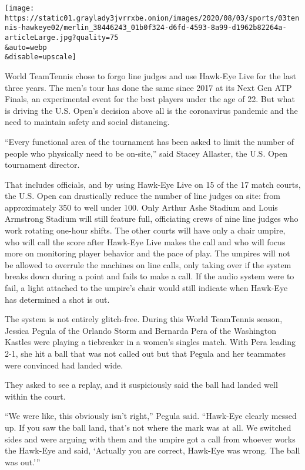 \texttt{[image: https://static01.graylady3jvrrxbe.onion/images/2020/08/03/sports/03tennis-hawkeye02/merlin\_38446243\_01b0f324-d6fd-4593-8a99-d1962b82264a-articleLarge.jpg?quality=75\\\&auto=webp\\\&disable=upscale]}

World TeamTennis chose to forgo line judges and use Hawk-Eye Live for
the last three years. The men's tour has done the same since 2017 at its
Next Gen ATP Finals, an experimental event for the best players under
the age of 22. But what is driving the U.S. Open's decision above all is
the coronavirus pandemic and the need to maintain safety and social
distancing.

``Every functional area of the tournament has been asked to limit the
number of people who physically need to be on-site,'' said Stacey
Allaster, the U.S. Open tournament director.

That includes officials, and by using Hawk-Eye Live on 15 of the 17
match courts, the U.S. Open can drastically reduce the number of line
judges on site: from approximately 350 to well under 100. Only Arthur
Ashe Stadium and Louis Armstrong Stadium will still feature full,
officiating crews of nine line judges who work rotating one-hour shifts.
The other courts will have only a chair umpire, who will call the score
after Hawk-Eye Live makes the call and who will focus more on monitoring
player behavior and the pace of play. The umpires will not be allowed to
overrule the machines on line calls, only taking over if the system
breaks down during a point and fails to make a call. If the audio system
were to fail, a light attached to the umpire's chair would still
indicate when Hawk-Eye has determined a shot is out.

The system is not entirely glitch-free. During this World TeamTennis
season, Jessica Pegula of the Orlando Storm and Bernarda Pera of the
Washington Kastles were playing a tiebreaker in a women's singles match.
With Pera leading 2-1, she hit a ball that was not called out but that
Pegula and her teammates were convinced had landed wide.

They asked to see a replay, and it suspiciously said the ball had landed
well within the court.

``We were like, this obviously isn't right,'' Pegula said. ``Hawk-Eye
clearly messed up. If you saw the ball land, that's not where the mark
was at all. We switched sides and were arguing with them and the umpire
got a call from whoever works the Hawk-Eye and said, `Actually you are
correct, Hawk-Eye was wrong. The ball was out.'''

